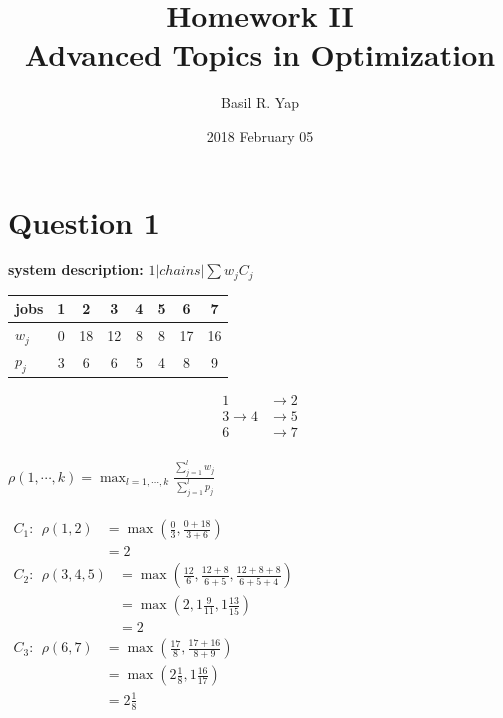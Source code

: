 \documentclass[a4paper, fleqn]{article}
\begin{document}
\title{Homework II \\ Advanced Topics in Optimization}
\author{Basil R. Yap}
\date{2018 February 05}
\maketitle

\section{Question 1}
\textbf{system description: }$1|chains|\sum w_jC_j$
\begin{center}
\begin{tabular}{| l | c | c | c | c | c | c | c |}
\hline
jobs & 1 & 2 & 3 & 4 & 5 & 6 & 7 \\
\hline
$w_j$ & 0 & 18 & 12 & 8 & 8 & 17 & 16 \\
$p_j$ & 3 & 6 & 6 & 5 & 4 & 8 & 9 \\
\hline
\end{tabular}
\end{center}
$$
\begin{aligned}
1&\rightarrow 2\\
3\rightarrow4&\rightarrow5\\
6&\rightarrow7
\end{aligned}
$$
\vspace{1pt}\\
$\rho(1,\cdots,k)=\max_{l=1,\cdots,k}\frac{\sum_{j=1}^lw_j}{\sum_{j=1}^lp_j}$\\
\vspace{1pt}\\
$\begin{aligned}C_1:\ \ \rho(1,2)&=\max\left(\frac{0}{3},\frac{0+18}{3+6}\right)\\&=2\end{aligned}$\\
$\begin{aligned}C_2:\ \ \rho(3,4,5)&=\max\left(\frac{12}{6},\frac{12+8}{6+5},\frac{12+8+8}{6+5+4}\right)\\&=\max\left(2,1\frac{9}{11},1\frac{13}{15}\right)\\&=2\end{aligned}$\\
$\begin{aligned}C_3:\ \ \rho(6,7)&=\max\left(\frac{17}{8},\frac{17+16}{8+9}\right)\\&=\max\left(2\frac{1}{8},1\frac{16}{17}\right)\\&=2\frac{1}{8}\end{aligned}$\\
\end{document}
